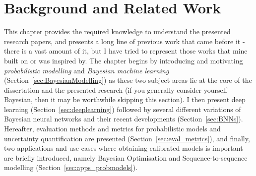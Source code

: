 
\chapter{Background and Related Work}
\label{chap:background}

This chapter provides the required knowledge to understand the presented research papers, and presents a long line of previous work that came before it - there is a vast amount of it, but I have tried to represent those works that mine built on or was inspired by. The chapter begins by introducing and motivating \textit{probabilistic modelling} and \textit{Bayesian machine learning} (Section~\ref{sec:BayesianModelling}) as these two subject areas lie at the core of the dissertation and the presented research (if you generally consider yourself Bayesian, then it may be worthwhile skipping this section). I then present deep learning (Section~\ref{sec:deeplearning}) followed by several different variations of Bayesian neural networks and their recent developments (Section~\ref{sec:BNNs}). Hereafter, evaluation methods and metrics for probabilistic models and uncertainty quantification are presented (Section~\ref{sec:eval_metrics}), and finally, two applications and use cases where obtaining calibrated models is important are briefly introduced, namely Bayesian Optimisation and Sequence-to-sequence modelling (Section~\ref{sec:apps_probmodels}).



